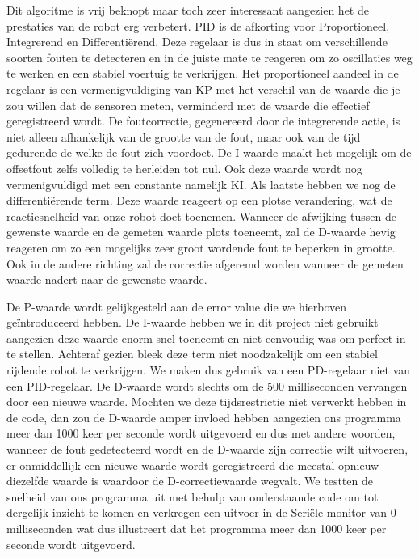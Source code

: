 Dit algoritme is vrij beknopt maar toch zeer interessant aangezien het de prestaties van de robot erg verbetert. PID is de afkorting voor Proportioneel, Integrerend en Differenti\"erend. Deze regelaar is dus in staat om verschillende soorten fouten te detecteren en in de juiste mate te reageren om zo oscillaties weg te werken en een stabiel voertuig te verkrijgen. Het proportioneel aandeel in de regelaar is een vermenigvuldiging van KP met het verschil van de waarde die je zou willen dat de sensoren meten, verminderd met de waarde die effectief geregistreerd wordt. De foutcorrectie, gegenereerd door de integrerende actie, is niet alleen afhankelijk van de grootte van de fout, maar ook van de tijd gedurende de welke de fout zich voordoet. De I-waarde maakt het mogelijk om de offsetfout zelfs volledig te herleiden tot nul. Ook deze waarde wordt nog vermenigvuldigd met een constante namelijk KI. Als laatste hebben we nog de differenti\"erende term. Deze waarde reageert op een plotse verandering, wat de reactiesnelheid van onze robot doet toenemen. Wanneer de afwijking tussen de gewenste waarde en de gemeten waarde plots toeneemt, zal de D-waarde hevig reageren om zo een mogelijks zeer groot wordende fout te beperken in grootte. Ook in de andere richting zal de correctie afgeremd worden wanneer de gemeten waarde nadert naar de gewenste waarde. 

De P-waarde wordt gelijkgesteld aan de error value die we hierboven ge\"introduceerd hebben. De I-waarde hebben we in dit project niet gebruikt aangezien deze waarde enorm snel toeneemt en niet eenvoudig was om perfect in te stellen. Achteraf gezien bleek deze term niet noodzakelijk om een stabiel rijdende robot te verkrijgen. We maken dus gebruik van een PD-regelaar niet van een PID-regelaar. De D-waarde wordt slechts om de 500 milliseconden vervangen door een nieuwe waarde. Mochten we deze tijdsrestrictie niet verwerkt hebben in de code, dan zou de D-waarde amper invloed hebben aangezien ons programma meer dan 1000 keer per seconde wordt uitgevoerd en dus met andere woorden, wanneer de fout gedetecteerd wordt en de D-waarde zijn correctie wilt uitvoeren, er onmiddellijk een nieuwe waarde wordt geregistreerd die meestal opnieuw diezelfde waarde is waardoor de D-correctiewaarde wegvalt. We testten de snelheid van ons programma uit met behulp van onderstaande code om tot dergelijk inzicht te komen en verkregen een uitvoer in de Seri\"ele monitor van 0 milliseconden wat dus illustreert dat het programma meer dan 1000 keer per seconde wordt uitgevoerd. 


